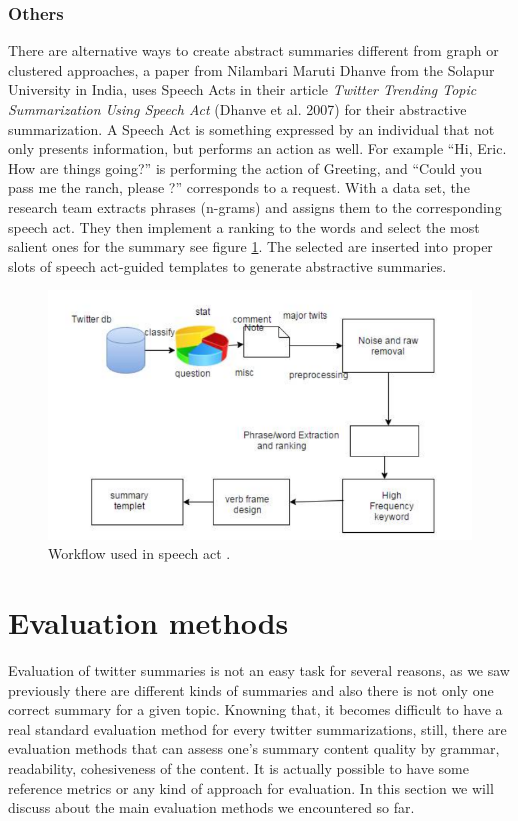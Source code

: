 \documentclass[runningheads]{llncs}
\begin{document}
\subsubsection{Others}

There are alternative ways to create abstract summaries different from graph or
clustered approaches, a paper from Nilambari Maruti Dhanve from the Solapur
University in India, uses Speech Acts in their article \textit{Twitter Trending
Topic Summarization Using Speech Act} (Dhanve et al.
2007) \cite{dhanve_twitter_2007} for their abstractive summarization.
A Speech Act is something expressed by an individual that not only presents
information, but performs an action as well. For example ``Hi, Eric. How are
things going?'' is performing the action of Greeting, and ``Could you pass me
the ranch, please ?'' corresponds to a request. With a data set, the research
team extracts phrases (n-grams) and assigns them to the corresponding speech
act. They then implement a ranking to the words and select the most salient
ones for the summary see figure \ref{fig:fig8}. The selected are inserted into
proper slots of speech act-guided templates to generate abstractive summaries.

\begin{figure}[H]
    \includegraphics[width=\textwidth]{fig8.png}
    \caption{Workflow used in speech act \cite{dhanve_twitter_2007}.}
    \label{fig:fig8}
\end{figure}

\section{Evaluation methods}

Evaluation of twitter summaries is not an easy task for several reasons, as we
saw previously there are different kinds of summaries and also there is not
only one correct summary for a given topic. Knowning that, it becomes
difficult to have a real standard evaluation method for every twitter
summarizations, still, there are evaluation methods that can assess one's
summary content quality by grammar, readability, cohesiveness of the content.
It is actually possible to have some reference metrics or any kind of approach
for evaluation. In this section we will discuss about the main evaluation
methods we encountered so far.
\end{document}
